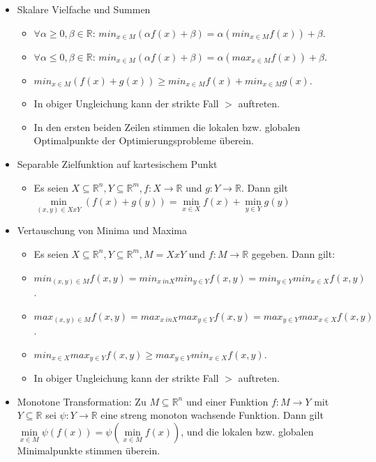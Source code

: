 \documentclass[paper=a4, fontsize=11pt]{scrartcl} %
\numberwithin{equation}{section} %
\numberwithin{figure}{section} %
\numberwithin{table}{section} %
\begin{document}
\begin{itemize}
\item Skalare Vielfache und Summen
\begin{itemize}
\item $\forall \alpha \ge 0, \beta \in \mathbb{R}$: $min_{x \in M} (\alpha f(x) + \beta) = \alpha (min_{x \in M} f(x)) + \beta$.
\item $\forall \alpha \le 0, \beta \in \mathbb{R}$: $min_{x \in M} (\alpha f(x) + \beta) = \alpha (max_{x \in M} f(x)) + \beta$.
\item $min_{x \in M} (f(x) + g(x)) \ge min_{x \in M} f(x) + min_{x \in M} g(x)$.
\item In obiger Ungleichung kann der strikte Fall $>$ auftreten.
\item In den ersten beiden Zeilen stimmen die lokalen bzw. globalen Optimalpunkte der Optimierungsprobleme überein.
\end{itemize}
\item Separable Zielfunktion auf kartesischem Punkt
\begin{itemize}
\item Es seien $X \subseteq \mathbb{R}^n, Y \subseteq \mathbb{R}^m, f: X \rightarrow \mathbb{R}$ und $g: Y \rightarrow \mathbb{R}$. Dann gilt $\min\limits_{(x,y)\in X x Y} (f(x) + g(y)) = \min\limits_{x \in X} f(x) + \min\limits_{y \in Y} g(y)$
\end{itemize}
\item Vertauschung von Minima und Maxima
\begin{itemize}
\item Es seien $X \subseteq \mathbb{R}^n, Y \subseteq \mathbb{R}^m, M = X x Y$ und $f: M \rightarrow \mathbb{R}$ gegeben. Dann gilt:
\item $min_{(x,y)\in M}f(x,y) = min_{x \ in X} min_{y \in Y} f(x,y) = min_{y \in Y} min_{x \in X} f(x,y)$.
\item $max_{(x,y)\in M}f(x,y) = max_{x \ in X} max_{y \in Y} f(x,y) = max_{y \in Y} max_{x \in X} f(x,y)$.
\item $min_{x \in X} max_{y \in Y} f(x,y) \ge max_{y \in Y} min_{x \in X} f(x,y)$.
\item In obiger Ungleichung kann der strikte Fall $>$ auftreten.
\end{itemize}
\item Monotone Transformation: Zu $M \subseteq \mathbb{R}^n$ und einer Funktion $f: M \rightarrow Y$ mit $Y \subseteq \mathbb{R}$ sei $\psi : Y \rightarrow \mathbb{R}$ eine streng monoton wachsende Funktion. Dann gilt $\min\limits_{x \in M} \psi(f(x)) = \psi(\min\limits_{x \in M} f(x))$, und die lokalen bzw. globalen Minimalpunkte stimmen überein.

\end{itemize}
\end{document}
